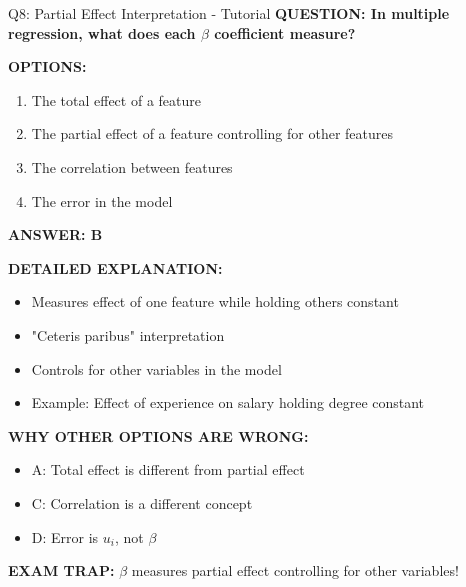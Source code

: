 \documentclass[8pt]{beamer}
\begin{document}
	\begin{frame}{Q8: Partial Effect Interpretation - Tutorial}
		\fontsize{6.5}{7.5}\selectfont
		\textbf{QUESTION: In multiple regression, what does each $\beta$ coefficient measure?}
		
		\vspace{0.1cm}
		\textbf{OPTIONS:}
		\begin{enumerate}
			\item The total effect of a feature
			\item The partial effect of a feature controlling for other features
			\item The correlation between features
			\item The error in the model
		\end{enumerate}
		
		\vspace{0.1cm}
		\textcolor{myblue}{\textbf{ANSWER: B}}
		
		\vspace{0.1cm}
		\textbf{DETAILED EXPLANATION:}
		\begin{itemize}
			\item Measures effect of one feature while holding others constant
			\item "Ceteris paribus" interpretation
			\item Controls for other variables in the model
			\item Example: Effect of experience on salary holding degree constant
		\end{itemize}
		
		\vspace{0.1cm}
		\textcolor{myred}{\textbf{WHY OTHER OPTIONS ARE WRONG:}}
		\begin{itemize}
			\item \textcolor{myred}{A:} Total effect is different from partial effect
			\item \textcolor{myred}{C:} Correlation is a different concept
			\item \textcolor{myred}{D:} Error is $u_i$, not $\beta$
		\end{itemize}
		
		\textcolor{myred}{\textbf{EXAM TRAP:}} $\beta$ measures \textcolor{myblue}{partial effect} controlling for other variables!
	\end{frame}
	
\end{document}
